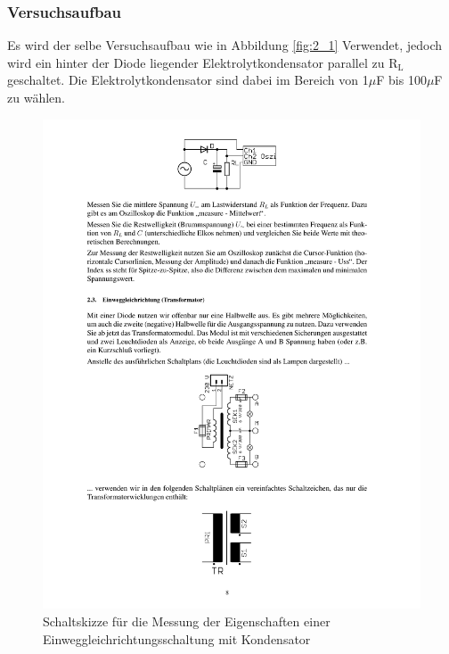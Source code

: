 \documentclass[12pt,a4paper]{article}
\begin{document}
\subsubsection{Versuchsaufbau}
Es wird der selbe Versuchsaufbau wie in Abbildung \ref{fig:2_1} Verwendet, jedoch wird ein hinter der Diode liegender Elektrolytkondensator parallel zu R$_\text{L}$ geschaltet. Die Elektrolytkondensator sind dabei im Bereich von 1$\mu$F bis 100$\mu$F zu wählen.
\begin{figure}[H] 
  \centering
    \includegraphics[trim = 10mm 235mm 10mm 10mm, clip, scale = 1]{ep2_14[Page8].pdf}
  	\caption[Schaltskizze für die Messung der Eigenschaften einer Einweggleichrichtungsschaltung mit Kondensator]{Schaltskizze für die Messung der Eigenschaften einer Einweggleichrichtungsschaltung mit Kondensator\footnotemark}
  \label{fig:2_2}
\end{figure}
\end{document}
